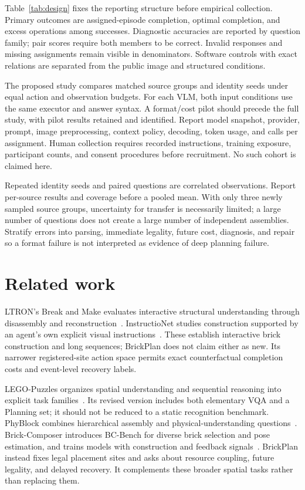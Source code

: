 \documentclass[10pt,twocolumn,letterpaper]{article}
\begin{document}
Table~\ref{tab:design} fixes the reporting structure before empirical
collection. Primary outcomes are assigned-episode completion, optimal
completion, and excess operations among successes. Diagnostic accuracies
are reported by question family; pair scores require both members to be
correct. Invalid responses and missing assignments remain visible in
denominators. Software controls with exact relations are separated from
the public image and structured conditions.

The proposed study compares matched source groups and identity seeds
under equal action and observation budgets. For each VLM, both input
conditions use the same executor and answer syntax. A format/cost pilot
should precede the full study, with pilot results retained and identified.
Report model snapshot, provider, prompt, image preprocessing, context
policy, decoding, token usage, and calls per assignment. Human collection
requires recorded instructions, training exposure, participant counts,
and consent procedures before recruitment. No such cohort is claimed here.

Repeated identity seeds and paired questions are correlated observations.
Report per-source results and coverage before a pooled mean. With only
three newly sampled source groups, uncertainty for transfer is necessarily
limited; a large number of questions does not create a large number of
independent assemblies. Stratify errors into parsing, immediate legality,
future cost, diagnosis, and repair so a format failure is not interpreted
as evidence of deep planning failure.

\section{Related work}
LTRON's Break and Make evaluates interactive structural understanding
through disassembly and reconstruction~\cite{ltron}. InstructioNet studies
construction supported by an agent's own explicit visual
instructions~\cite{instructionet}. These establish interactive brick
construction and long sequences; BrickPlan does not claim either as new.
Its narrower registered-site action space permits exact counterfactual
completion costs and event-level recovery labels.

LEGO-Puzzles organizes spatial understanding and sequential reasoning
into explicit task families~\cite{lego}. Its revised version includes
both elementary VQA and a Planning set; it should not be reduced to a
static recognition benchmark. PhyBlock combines hierarchical assembly
and physical-understanding questions~\cite{phyblock}.
Brick-Composer introduces BC-Bench for diverse brick selection and
pose estimation, and trains models with construction and feedback
signals~\cite{composer}. BrickPlan instead fixes legal placement sites
and asks about resource coupling, future legality, and delayed recovery.
It complements these broader spatial tasks rather than replacing them.
\end{document}
